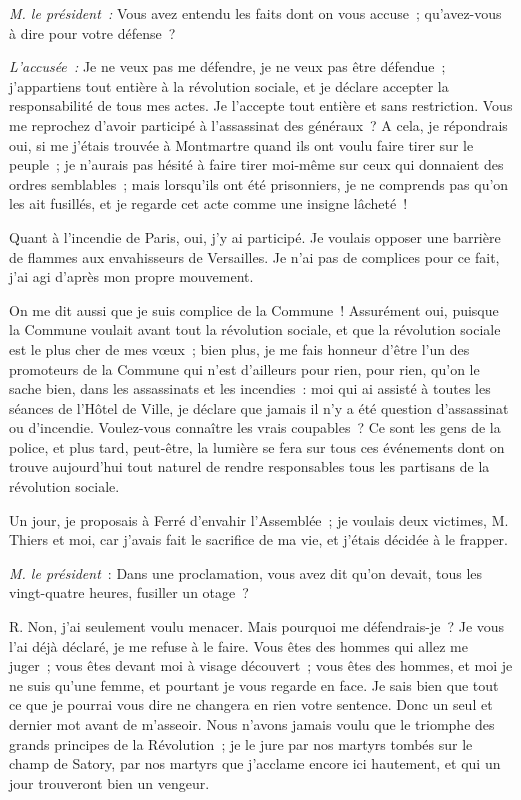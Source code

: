 \documentclass[french,twoside]{book} %
\begin{document}
\noindent \emph{M. le président :} Vous avez entendu les faits dont on vous accuse ; qu’avez-vous à dire pour votre défense ?\par
\emph{L’accusée :} Je ne veux pas me défendre, je ne veux pas être défendue ; j’appartiens tout entière à la révolution sociale, et je déclare accepter la responsabilité de tous mes actes. Je l’accepte tout entière et sans restriction. Vous me reprochez d’avoir participé à l’assassinat des généraux ? A cela, je répondrais oui, si me j’étais trouvée à Montmartre quand ils ont voulu faire tirer sur le peuple ; je n’aurais pas hésité à faire tirer moi-même sur ceux qui donnaient des ordres semblables ; mais lorsqu’ils ont été prisonniers, je ne comprends pas qu’on les ait fusillés, et je regarde cet acte comme une insigne lâcheté !\par
Quant à l’incendie de Paris, oui, j’y ai participé. Je voulais opposer une barrière de flammes aux envahisseurs de Versailles. Je n’ai pas de complices pour ce fait, j’ai agi d’après mon propre mouvement.\par
On me dit aussi que je suis complice de la Commune ! Assurément oui, puisque la Commune voulait avant tout la révolution sociale, et que la révolution sociale est le plus cher de mes vœux ; bien plus, je me fais honneur d’être l’un des promoteurs de la Commune qui n’est d’ailleurs pour rien, pour rien, qu’on le sache bien, dans les assassinats et les incendies : moi qui ai assisté à toutes les séances de l’Hôtel de Ville, je déclare que jamais il n’y a été question d’assassinat ou d’incendie. Voulez-vous connaître les vrais coupables ? Ce sont les gens de la police, et plus tard, peut-être, la lumière se fera sur  tous ces événements dont on trouve aujourd’hui tout naturel de rendre responsables tous les partisans de la révolution sociale.\par
Un jour, je proposais à Ferré d’envahir l’Assemblée ; je voulais deux victimes, M. Thiers et moi, car j’avais fait le sacrifice de ma vie, et j’étais décidée à le frapper.\par
\emph{M. le président} : Dans une proclamation, vous avez dit qu’on devait, tous les vingt-quatre heures, fusiller un otage ?\par
R. Non, j’ai seulement voulu menacer. Mais pourquoi me défendrais-je ? Je vous l’ai déjà déclaré, je me refuse à le faire. Vous êtes des hommes qui allez me juger ; vous êtes devant moi à visage découvert ; vous êtes des hommes, et moi je ne suis qu’une femme, et pourtant je vous regarde en face. Je sais bien que tout ce que je pourrai vous dire ne changera en rien votre sentence. Donc un seul et dernier mot avant de m’asseoir. Nous n’avons jamais voulu que le triomphe des grands principes de la Révolution ; je le jure par nos martyrs tombés sur le champ de Satory, par nos martyrs que j’acclame encore ici hautement, et qui un jour trouveront bien un vengeur.\par
\end{document}
